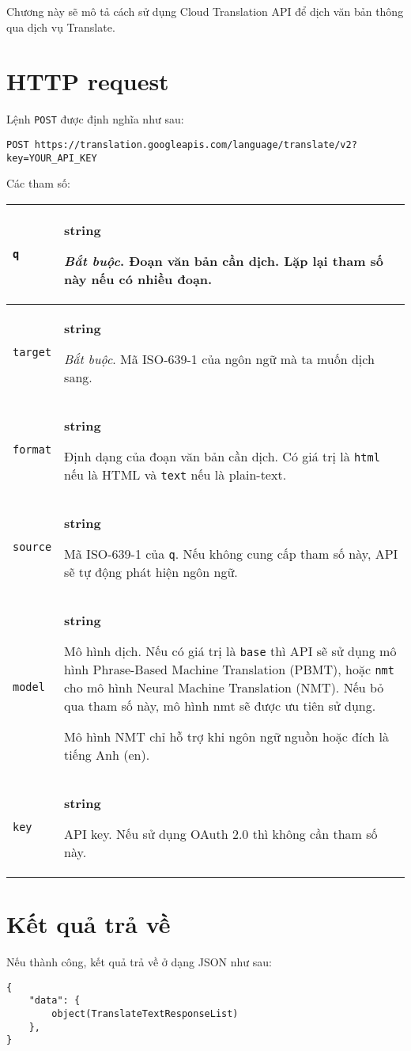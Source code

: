 \documentclass[../thesis.tex]{subfiles}
\begin{document}
Chương này sẽ mô tả cách sử dụng Cloud Translation API để dịch văn bản thông qua dịch vụ Translate.

\section{HTTP request}

Lệnh \lstinline{POST} được định nghĩa như sau:

\begin{lstlisting}[style=link]
POST https://translation.googleapis.com/language/translate/v2?key=YOUR_API_KEY
\end{lstlisting}

Các tham số:

\begin{center}
\begin{tabularx}{\textwidth}{|p{}|X|}
\hline
\lstinline{q} & \textbf{string}

\textit{Bắt buộc}. Đoạn văn bản cần dịch. Lặp lại tham số này nếu có nhiều đoạn.\\
\hline
\lstinline{target} & \textbf{string}

\textit{Bắt buộc}. Mã ISO-639-1 của ngôn ngữ mà ta muốn dịch sang.\\
\hline
\lstinline{format} & \textbf{string}

Định dạng của đoạn văn bản cần dịch. Có giá trị là \lstinline{html} nếu là HTML và \lstinline{text} nếu là plain-text.\\
\hline
\lstinline{source} & \textbf{string}

Mã ISO-639-1 của \lstinline{q}. Nếu không cung cấp tham số này, API sẽ tự động phát hiện ngôn ngữ.\\
\hline
\lstinline{model} & \textbf{string}

Mô hình dịch. Nếu có giá trị là \lstinline{base} thì API sẽ sử dụng mô hình Phrase-Based Machine Translation (PBMT), hoặc \lstinline{nmt} cho mô hình Neural Machine Translation (NMT). Nếu bỏ qua tham số này, mô hình nmt sẽ được ưu tiên sử dụng.

Mô hình NMT chỉ hỗ trợ khi ngôn ngữ nguồn hoặc đích là tiếng Anh (en).\\
\hline
\lstinline{key} & \textbf{string}

API key. Nếu sử dụng OAuth 2.0 thì không cần tham số này.\\
\hline
\end{tabularx}
\end{center}

\section{Kết quả trả về}
Nếu thành công, kết quả trả về ở dạng JSON như sau:
\begin{lstlisting}[style=link]
{
	"data": {
		object(TranslateTextResponseList)
	},
}
\end{lstlisting}
\end{document}
